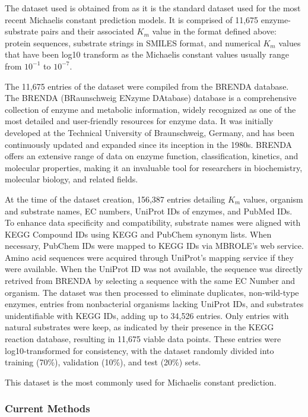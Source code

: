 The dataset used is obtained from \citeauthor{km1} as it is the standard dataset used for the most recent Michaelis
constant prediction models. It is comprised of 11,675 enzyme-substrate pairs and their associated $K_m$ value in
the format defined above: protein sequences, substrate strings in SMILES format, and numerical $K_m$ values
that have been log10 transform as the Michaelis constant values usually range from $10^{-1}$ to  $10^{-7}$.

The 11,675 entries of the dataset were compiled from the BRENDA database. \cite{brenda} The BRENDA 
(BRaunschweig ENzyme DAtabase) database is a comprehensive collection of 
enzyme and metabolic information, widely recognized as one of the most detailed 
and user-friendly resources for enzyme data. It was initially developed at the Technical 
University of Braunschweig, Germany, and has been continuously updated and expanded since its 
inception in the 1980s. BRENDA offers an extensive range of data on enzyme function, 
classification, kinetics, and molecular properties, making it an invaluable tool for 
researchers in biochemistry, molecular biology, and related fields.

At the time of the dataset creation, 156,387 entries detailing $K_m$ values, organism and substrate names, 
EC numbers, UniProt IDs of enzymes, and PubMed IDs. To enhance data specificity and compatibility, 
substrate names were aligned with KEGG Compound IDs using KEGG and PubChem synonym lists. \cite{kegg}
When necessary, PubChem IDs were mapped to KEGG IDs via MBROLE's web service. \cite{pubchem,mbrole}
Amino acid sequences were acquired through UniProt's mapping service if they were available. \cite{uniprot}
When the UniProt ID was not available, the sequence was directly retrived from BRENDA by selecting a
sequence with the same EC Number and organism. The dataset was then processed to eliminate duplicates, 
non-wild-type enzymes, 
entries from nonbacterial organisms lacking UniProt IDs, and substrates unidentifiable with KEGG IDs, 
adding up to 34,526 entries. Only entries with natural substrates were keep, 
as indicated by their presence in the KEGG reaction database, resulting in 11,675 viable data points. 
These entries were log10-transformed for consistency, with the dataset randomly divided into training 
(70\%), validation (10\%), and test (20\%) sets. 

This dataset is the most commonly used for Michaelis constant prediction. 

\subsubsection{Current Methods}

